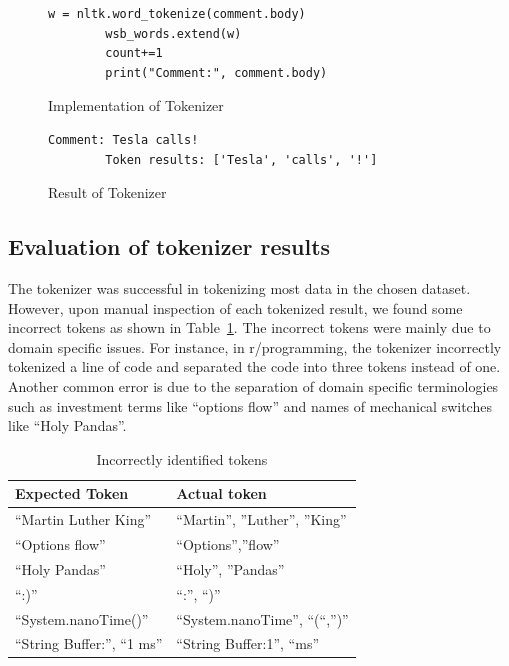 \documentclass[sigconf,nonacm=true]{acmart}
\begin{document}
\renewcommand{\lstlistingname}{Figure}%
\renewcommand{\lstlistlistingname}{List of \lstlistingname s}%

\begin{figure}[H]
	\begin{lstlisting}[gobble=10]
	    w = nltk.word_tokenize(comment.body)
	    wsb_words.extend(w)
	    count+=1
	    print("Comment:", comment.body)
	\end{lstlisting}
	\caption{Implementation of Tokenizer}
\end{figure}

\begin{figure}[H]
	\begin{lstlisting}[gobble=10]
	    Comment: Tesla calls!
	    Token results: ['Tesla', 'calls', '!']
	\end{lstlisting}
	\caption{Result of Tokenizer}
\end{figure}

\subsection{Evaluation of tokenizer results}
The tokenizer was successful in tokenizing most data in the chosen dataset. However, upon manual inspection of each tokenized result, we found some incorrect tokens as shown in Table~\ref{tab:token}. The incorrect tokens were mainly due to domain specific issues. For instance, in r/programming, the tokenizer incorrectly tokenized a line of code and separated the code into three tokens instead of one. Another common error is due to the separation of domain specific terminologies such as investment terms like “options flow” and names of mechanical switches like “Holy Pandas”.

\begin{table}[h]
	\begin{tabular}{|l|l|}
	\hline
	 {\bf Expected Token} &  {\bf Actual token} \\ \hline
	 “Martin Luther King”& “Martin”, ”Luther”, ”King”  \\ \hline
	 “Options flow” &  “Options”,”flow” \\ \hline
	 “Holy Pandas”& “Holy”, ”Pandas” \\ \hline
	“:)” &  “:”, “)”\\ \hline
	 “System.nanoTime()”& “System.nanoTime”, “(“,”)” \\ \hline
	“String Buffer:”, “1 ms”  &  “String Buffer:1”, “ms”\\ \hline
	\end{tabular}
	\caption{Incorrectly identified tokens}
	\label{tab:token}
\end{table}
\end{document}
